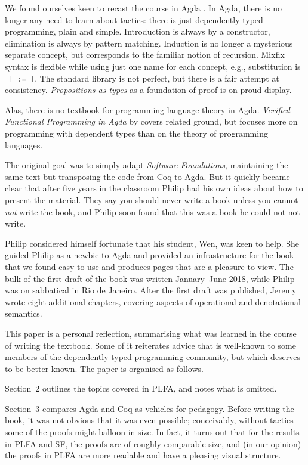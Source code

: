 \documentclass[preprint,authoryear]{elsarticle}
\begin{document}
We found ourselves keen to recast the course in Agda \citep{Bove-et-al-2009}.
In Agda, there is
no longer any need to learn about tactics: there is just
dependently-typed programming, plain and simple. Introduction is
always by a constructor, elimination is always by pattern
matching. Induction is no longer a mysterious separate concept, but
corresponds to the familiar notion of recursion. Mixfix syntax is
flexible while using just one name for each concept, e.g.,
substitution is \texttt{\_[\_:=\_]}. The standard library is not perfect, but
there is a fair attempt at consistency. \emph{Propositions as types} as a
foundation of proof is on proud display.

Alas, there is no textbook for programming language theory in
Agda.  \emph{Verified Functional Programming in Agda} by \citep{Stump-2016}
covers related ground, but focuses more on programming with dependent
types than on the theory of programming languages.

The original goal was to simply adapt \emph{Software Foundations},
maintaining the same text but transposing the code from Coq to Agda.
But it quickly became clear that after five years in the
classroom Philip had his own ideas about how to present the material.  They
say you should never write a book unless you cannot \emph{not} write the
book, and Philip soon found that this was a book he could not not
write.

Philip considered himself fortunate that his student, Wen, was
keen to help.  She guided Philip as a newbie to Agda and provided an
infrastructure for the book that we found easy to use and produces
pages that are a pleasure to view.  The bulk of the first draft of the
book was written January--June 2018, while Philip was on sabbatical in
Rio de Janeiro.  After the first draft was published, Jeremy wrote
eight additional chapters, covering aspects of operational and
denotational semantics.

This paper is a personal reflection, summarising what was learned in the
course of writing the textbook. Some of it reiterates advice that is
well-known to some members of the dependently-typed programming
community, but which deserves to be better known.  The paper is
organised as follows.

Section~2 outlines the
topics covered in PLFA, and notes what is omitted.  

Section~3 compares Agda and Coq as vehicles for pedagogy.  Before
writing the book, it was not obvious that it was even possible;
conceivably, without tactics some of the proofs might
balloon in size. In fact, it turns out that for the results in PLFA
and SF, the proofs are of roughly comparable size, and (in our opinion)
the proofs in PLFA are more readable and have a pleasing visual
structure.
\end{document}
